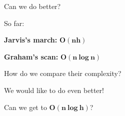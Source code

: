\documentclass[14pt]{beamer}
\begin{document}
\begin{frame}{Can we do better?}
	\begin{center}
		\begin{fullpageitemize}
			\item<1-> So far:
			\begin{baseitemize}
				\item<2->[\rtarrow] \textbf{Jarvis's march:} \textcolor{colorgreen}{$\bm{O(nh)}$}
				\item<3->[\rtarrow] \textbf{Graham's scan:} \textcolor{colorgreen}{$\bm{O(n\ log\ n)}$}
			\end{baseitemize}
		\vspace{5mm}		
		\item<4->[\rtarrow] How do we compare their complexity?\\
		\item<5->[\rtarrow] We would like to do even better!
		\end{fullpageitemize}
		Can we get to \textcolor{colorgreen}{$\bm{O(n\ log\ h)}$}?
	\end{center}
\end{frame}
\end{document}
